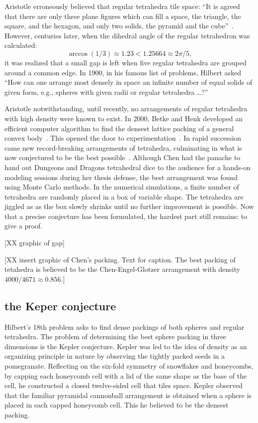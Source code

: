 \documentclass{llncs}
\begin{document}
Aristotle erroneously believed that regular tetrahedra tile space:
``It is agreed that there are only three plane figures which can fill
a space, the triangle, the square, and the hexagon, and only two
solids, the pyramid and the cube''~\cite{Aristotle}.  However,
centuries later, when the dihedral angle of the regular tetrahedron
was calculated:
\[
\arccos(1/3) \approx 1.23 < 1.25664 \approx 2\pi/5,
\]
it was realized that a small gap is left when five regular tetrahedra
are grouped around a common edge.  In 1900, in his famous list of
problems, Hilbert asked ``How can one arrange most densely in space an
infinite number of equal solids of given form, e.g., spheres with
given radii or regular tetrahedra \dots?''

Aristotle notwithstanding, until recently, no arrangements of regular
tetrahedra with high density were known to exist.  In 2000, Betke and
Henk developed an efficient computer algorithm to find the densest
lattice packing of a general convex body~\cite{BH2000}.  This opened
the door to experimentation~\cite{Conway-2006}.  In rapid
succession came new record-breaking arrangements of tetrahedra,
culminating in what is now conjectured to be the best
possible~\cite{Chen-2010}.  Although Chen had the panache to hand out
Dungeons and Dragons tetrahedral dice to the audience for a hands-on
modeling sessions during her thesis defense, the best arrangement was found
using Monte Carlo methods.  In the numerical simulations, a finite
number of tetrahedra are randomly placed in a box of variable shape.
The tetrahedra are jiggled as as the box slowly shrinks until no
further improvement is possible.  Now that a precise conjecture has
been formulated, the hardest part still remains: to give a
proof.  






[XX graphic of gap]

[XX insert graphic of Chen's packing.  Text for caption.  The best packing of
tetahedra is believed to be the Chen-Engel-Glotzer arrangement with density
$4000/4671\approx 0.856$.]

\subsection{the Keper conjecture}

Hilbert's 18th problem asks to find dense packings of both spheres and regular tetrahedra.
The problem of determining the best sphere packing in three dimensions
is the Kepler conjecture.  Kepler was led to the idea of density as an
organizing principle in nature by observing the tightly packed seeds
in a pomegranate.  Reflecting on the six-fold symmetry of snowflakes
and honeycombs, by capping each honeycomb cell with a
lid of the same shape as the base of the cell, he constructed a closed twelve-sided cell 
 that tiles space.  Kepler observed that the familiar pyramidal cannonball
arrangement is obtained when a sphere is placed in each capped
honeycomb cell.  This he  believed to be the densest packing.
\end{document}
